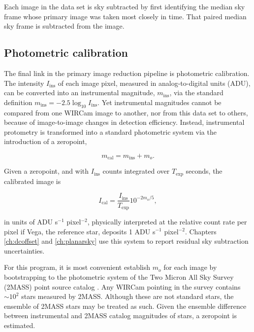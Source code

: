 \documentclass[iop]{emulateapj}
\begin{document}
Each image in the data set is sky subtracted by first identifying the median sky frame whose primary image was taken most closely in time. That paired median sky frame is subtracted from the image.


\subsection{Photometric calibration}
\label{sec:photocal}

The final link in the primary image reduction pipeline is photometric calibration. The intensity $I_\mathrm{ins}$ of each image pixel, measured in analog-to-digital units (ADU), can be converted into an instrumental magnitude, $m_\mathrm{ins}$, via the standard definition $m_\mathrm{ins} = -2.5\log_{10}I_\mathrm{ins}$. Yet instrumental magnitudes cannot be compared from one WIRCam image to another, nor from this data set to others, because of image-to-image changes in detection efficiency. Instead, instrumental protometry is transformed into a standard photometric system via the introduction of a zeropoint,

\begin{equation}
    m_\mathrm{cal} = m_\mathrm{ins} + m_o.
    \label{eq:zpdefinition}
\end{equation}

Given a zeropoint, and with $I_\mathrm{ins}$ counts integrated over $T_\text{exp}$ seconds, the calibrated image is

\begin{equation}
    I_\mathrm{cal} = \frac{I_\mathrm{ins}}{T_\text{exp}} 10^{-2m_o/5},
    \label{eq:fluxcalibration}
\end{equation}

\noindent in units of ADU s$^{-1}$ pixel$^{-2}$, physically interpreted at the relative count rate per pixel if Vega, the reference star, deposits 1 ADU s$^{-1}$ pixel$^{-2}$. Chapters \ref{ch:dcoffset} and \ref{ch:planarsky} use this system to report residual sky subtraction uncertainties.

For this program, it is most convenient establish $m_o$ for each image by bootstrapping to the photometric system of the Two Micron All Sky Survey (2MASS) point source catalog \citep{Skrutskie:2006}. Any WIRCam pointing in the survey contains $\sim 10^2$ stars measured by 2MASS. Although these are not standard stars, the ensemble of 2MASS stars may be treated as such. Given the ensemble difference between instrumental and 2MASS catalog magnitudes of stars, a zeropoint is estimated.
\end{document}
